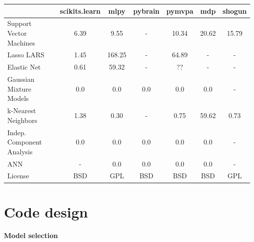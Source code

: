 \documentclass[twoside,11pt]{article}
\begin{document}
\begin{center}


\begin{tabular}{l c c c c c c}
\hline\hline %
 & scikits.learn & mlpy & pybrain & pymvpa &  mdp & shogun \\ [0.5ex]
\hline
Support Vector Machines & 6.39 & 9.55 & - & 10.34 & 20.62 & 15.79 \\
Lasso LARS & 1.45 & 168.25   & -       &  64.89     & -    & - \\
Elastic Net & 0.61 & 59.32 & -  &  ??  & -  & - \\
Gaussian Mixture Models  & 0.0 & 0.0   & 0.0       &  0.0     & 0.0    & - \\
k-Nearest Neighbors & 1.38 & 0.30  & - &  0.75 & 59.62    & 0.73 \\
Indep. Component Analysis & 0.0 & 0.0  & 0.0  & 0.0  & 0.0  & - \\
ANN  & - & 0.0  & 0.0  & 0.0  & 0.0  & - \\
License &  BSD & GPL & BSD  &  BSD  & BSD  & GPL \\
\hline
\end{tabular}

\end{center}







\section{Code design}



\paragraph {Model selection}
\end{document}
